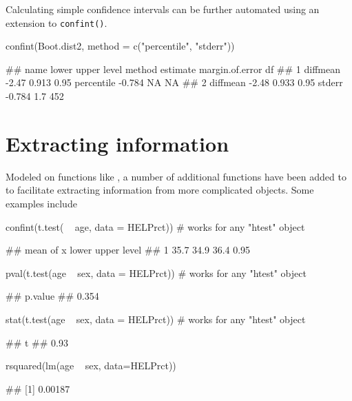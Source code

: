 Calculating simple confidence intervals can be further automated using
an extension to \texttt{confint()}.

\begin{Schunk}
\begin{Sinput}
confint(Boot.dist2, method = c("percentile", "stderr"))
\end{Sinput}
\begin{Soutput}
##       name lower upper level     method estimate margin.of.error  df
## 1 diffmean -2.47 0.913  0.95 percentile   -0.784              NA  NA
## 2 diffmean -2.48 0.933  0.95     stderr   -0.784             1.7 452
\end{Soutput}
\end{Schunk}

\section{Extracting information}\label{extracting-information}

Modeled on functions like , a number of additional
functions have been added to  to facilitate extracting
information from more complicated objects. Some examples include

\begin{Schunk}
\begin{Sinput}
confint(t.test( ~ age, data = HELPrct))    # works for any "htest" object
\end{Sinput}
\begin{Soutput}
##   mean of x lower upper level
## 1      35.7  34.9  36.4  0.95
\end{Soutput}
\begin{Sinput}
pval(t.test(age ~ sex, data = HELPrct))    # works for any "htest" object
\end{Sinput}
\begin{Soutput}
## p.value 
##   0.354
\end{Soutput}
\begin{Sinput}
stat(t.test(age ~ sex, data = HELPrct))    # works for any "htest" object
\end{Sinput}
\begin{Soutput}
##    t 
## 0.93
\end{Soutput}
\begin{Sinput}
rsquared(lm(age ~ sex, data=HELPrct))
\end{Sinput}
\begin{Soutput}
## [1] 0.00187
\end{Soutput}
\end{Schunk}


